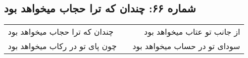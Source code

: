 \begin{center}
\section*{شماره ۶۶: چندان که ترا حجاب میخواهد بود}
\label{sec:066}
\begin{longtable}{l p{0.5cm} r}
چندان که ترا حجاب میخواهد بود
&&
از جانب تو عتاب میخواهد بود
\\
چون پای تو در رکاب میخواهد بود
&&
سودای تو در حساب میخواهد بود
\\
\end{longtable}
\end{center}
